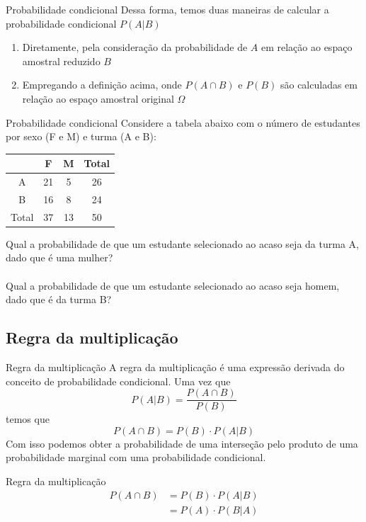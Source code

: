\documentclass[10pt]{beamer}\usepackage[]{graphicx}\usepackage[]{color}
\theoremstyle{definition}
\begin{document}
\begin{frame}{Probabilidade condicional}
  Dessa forma, temos duas maneiras de calcular a probabilidade
  condicional $P(A|B)$
  \begin{enumerate}
  \item Diretamente, pela consideração da probabilidade de $A$ em
    relação ao espaço amostral reduzido $B$
  \item Empregando a definição acima, onde $P(A \cap B)$ e $P(B)$ são
    calculadas em relação ao espaço amostral original $\Omega$
  \end{enumerate}
\end{frame}

\begin{frame}{Probabilidade condicional}
  Considere a tabela abaixo com o número de estudantes por sexo (F e M)
  e turma (A e B):
  \begin{table}
    \centering
    \begin{tabular}{c|cc|c}
      \hline
      & F & M & Total \\
      \hline
      A & 21 & 5 & 26 \\
      B & 16 & 8 & 24 \\
      \hline
      Total & 37 & 13 & 50 \\
      \hline
    \end{tabular}
  \end{table}
  Qual a probabilidade de que um estudante selecionado ao acaso seja da
  turma A, dado que é uma mulher? \\~\\
  Qual a probabilidade de que um estudante selecionado ao acaso seja
  homem, dado que é da turma B?
\end{frame}

\subsection{Regra da multiplicação}

\begin{frame}[fragile]{Regra da multiplicação}
  A regra da multiplicação é uma expressão derivada do conceito de
  probabilidade condicional. Uma vez que
  \begin{equation*}
    P(A|B) = \frac{P(A\cap B)}{P(B)}
  \end{equation*}
  temos que
  \begin{equation*}
    P(A\cap B) = P(B) \cdot P(A|B)
  \end{equation*}
  Com isso podemos obter a probabilidade de uma interseção pelo produto
  de uma probabilidade marginal com uma probabilidade condicional.
  \begin{block}{Regra da multiplicação}
    \begin{align*}
      P(A\cap B) &= P(B) \cdot P(A|B) \\
      &= P(A) \cdot P(B|A)
    \end{align*}
  \end{block}
\end{frame}
\end{document}
